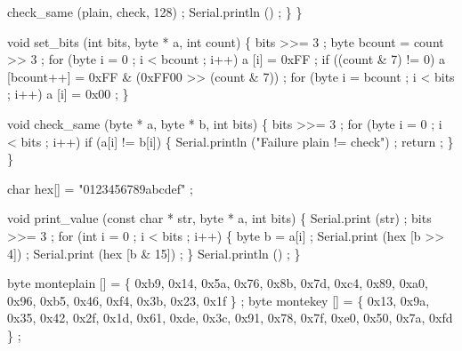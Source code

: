 \begin{DoxyCodeInclude}
      check\_same (plain, check, 128) ;
      Serial.println () ;
    \}
\}

\textcolor{keywordtype}{void} set\_bits (\textcolor{keywordtype}{int} bits, byte * a, \textcolor{keywordtype}{int} count)
\{
  bits >>= 3 ;
  byte bcount = count >> 3 ;
  \textcolor{keywordflow}{for} (byte i = 0 ; i < bcount ; i++)
    a [i] = 0xFF ;
  \textcolor{keywordflow}{if} ((count & 7) != 0)
    a [bcount++] = 0xFF & (0xFF00 >> (count & 7)) ;
  \textcolor{keywordflow}{for} (byte i = bcount ; i < bits ; i++)
    a [i] = 0x00 ;
\}

\textcolor{keywordtype}{void} check\_same (byte * a, byte * b, \textcolor{keywordtype}{int} bits)
\{
  bits >>= 3 ;
  \textcolor{keywordflow}{for} (byte i = 0 ; i < bits ; i++)
    \textcolor{keywordflow}{if} (a[i] != b[i])
      \{
        Serial.println (\textcolor{stringliteral}{"Failure plain != check"}) ;
        return ;
      \}
\}

\textcolor{keywordtype}{char} hex[] = \textcolor{stringliteral}{"0123456789abcdef"} ;


\textcolor{keywordtype}{void} print\_value (\textcolor{keyword}{const} \textcolor{keywordtype}{char} * str, byte * a, \textcolor{keywordtype}{int} bits)
\{
  Serial.print (str) ;
  bits >>= 3 ;
  \textcolor{keywordflow}{for} (\textcolor{keywordtype}{int} i = 0 ; i < bits ; i++)
    \{
      byte b = a[i] ;
      Serial.print (hex [b >> 4]) ;
      Serial.print (hex [b & 15]) ;
    \}
  Serial.println () ;
\}

byte monteplain [] = 
  \{ 0xb9, 0x14, 0x5a, 0x76, 0x8b, 0x7d, 0xc4, 0x89, 
    0xa0, 0x96, 0xb5, 0x46, 0xf4, 0x3b, 0x23, 0x1f \} ;
byte montekey []   = 
  \{ 0x13, 0x9a, 0x35, 0x42, 0x2f, 0x1d, 0x61, 0xde, 
    0x3c, 0x91, 0x78, 0x7f, 0xe0, 0x50, 0x7a, 0xfd \} ;


\end{DoxyCodeInclude}
